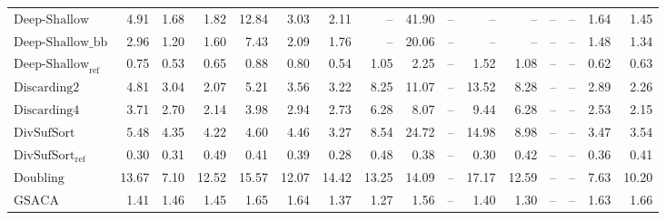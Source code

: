 \begin{table}[h]
{\begin{tabular}{lrrrrrrrrrrrrrrr}
    $\text{Deep-Shallow}$ & 4.91 & 1.68 & 1.82 & {\color{red}12.84} & 3.03 & 2.11 & {\color{darkgray}--} & {\color{red}41.90} & {\color{darkgray}--} & {\color{darkgray}--} & {\color{darkgray}--} & {\color{darkgray}--} & {\color{darkgray}--} & 1.64 & 1.45 \\
    $\text{Deep-Shallow\_bb}$ & 2.96 & 1.20 & 1.60 & 7.43 & 2.09 & 1.76 & {\color{darkgray}--} & 20.06 & {\color{darkgray}--} & {\color{darkgray}--} & {\color{darkgray}--} & {\color{darkgray}--} & {\color{darkgray}--} & 1.48 & 1.34 \\
    $\text{Deep-Shallow}_{\text{ref}}$ & 0.75 & {\color{green!60!black}0.53} & {\color{green!60!black}0.65} & 0.88 & 0.80 & 0.54 & 1.05 & 2.25 & {\color{darkgray}--} & 1.52 & 1.08 & {\color{darkgray}--} & {\color{darkgray}--} & 0.62 & 0.63 \\
    $\text{Discarding2}$ & 4.81 & 3.04 & 2.07 & 5.21 & 3.56 & 3.22 & 8.25 & 11.07 & {\color{darkgray}--} & {\color{red}13.52} & {\color{red}8.28} & {\color{darkgray}--} & {\color{darkgray}--} & 2.89 & 2.26 \\
    $\text{Discarding4}$ & 3.71 & 2.70 & 2.14 & 3.98 & 2.94 & 2.73 & 6.28 & 8.07 & {\color{darkgray}--} & 9.44 & 6.28 & {\color{darkgray}--} & {\color{darkgray}--} & 2.53 & 2.15 \\
    $\text{DivSufSort}$ & 5.48 & 4.35 & 4.22 & 4.60 & 4.46 & 3.27 & 8.54 & {\color{red}24.72} & {\color{darkgray}--} & {\color{red}14.98} & {\color{red}8.98} & {\color{darkgray}--} & {\color{darkgray}--} & 3.47 & 3.54 \\
    $\text{DivSufSort}_{\text{ref}}$ & {\color{green!60!black}0.30} & {\color{green!60!black}0.31} & {\color{green!60!black}0.49} & {\color{green!60!black}0.41} & {\color{green!60!black}0.39} & {\color{green!60!black}0.28} & {\color{green!60!black}0.48} & {\color{green!60!black}0.38} & {\color{darkgray}--} & {\color{green!60!black}0.30} & {\color{green!60!black}0.42} & {\color{darkgray}--} & {\color{darkgray}--} & {\color{green!60!black}0.36} & {\color{green!60!black}0.41} \\
    $\text{Doubling}$ & {\color{red}13.67} & {\color{red}7.10} & {\color{red}12.52} & {\color{red}15.57} & {\color{red}12.07} & {\color{red}14.42} & {\color{red}13.25} & 14.09 & {\color{darkgray}--} & {\color{red}17.17} & {\color{red}12.59} & {\color{darkgray}--} & {\color{darkgray}--} & {\color{red}7.63} & {\color{red}10.20} \\
    $\text{GSACA}$ & 1.41 & 1.46 & 1.45 & 1.65 & 1.64 & 1.37 & 1.27 & 1.56 & {\color{darkgray}--} & 1.40 & 1.30 & {\color{darkgray}--} & {\color{darkgray}--} & 1.63 & 1.66 \\

\end{tabular}}
\end{table}
